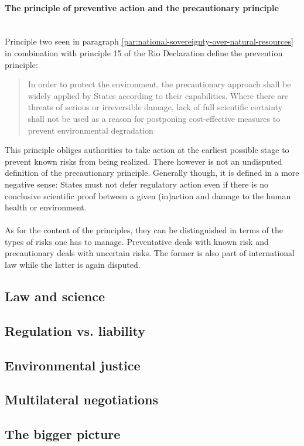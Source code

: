 \documentclass[../summary.tex]{subfiles}
\begin{document}
			\paragraph{The principle of preventive action and the precautionary principle}\mbox{}\\
				Principle two seen in paragraph \ref{par:national-sovereignty-over-natural-resources} in combination with principle 15 of the Rio Declaration define the prevention principle: 
				\begin{quote}
					In order to protect the environment, the precautionary approach shall be widely applied by States according to their capabilities. Where there are threats of serious or irreversible damage, lack of full scientific certainty shall not be used as a reason for postponing cost-effective measures to prevent environmental degradation
				\end{quote}
				This principle obliges authorities to take action at the earliest possible stage to prevent known risks from being realized. There however is not an undisputed definition of the precautionary principle. Generally though, it is defined in a more negative sense: States must not defer regulatory action even if there is no conclusive scientific proof between a given (in)action and damage to the human health or environment.\\
				\\
				As for the content of the principles, they can be distinguished in terms of the types of risks one has to manage. Preventative deals with known risk and precautionary deals with uncertain risks. The former is also part of international law while the latter is again disputed. 
	\subsection{Law and science}
	
	\subsection{Regulation vs. liability}
	
	\subsection{Environmental justice}
	
	\subsection{Multilateral negotiations}
	
	\subsection{The bigger picture}
\end{document}
